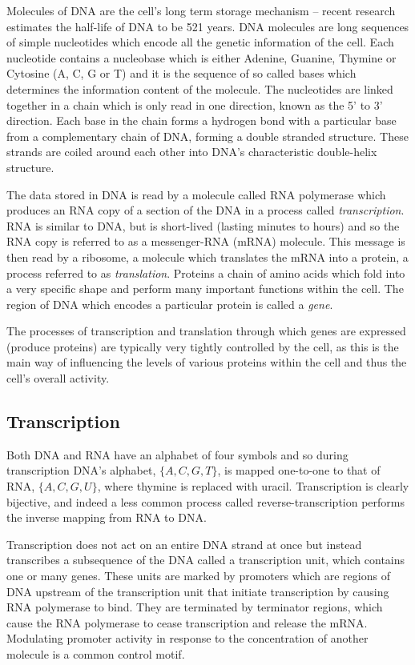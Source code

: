 Molecules of DNA are the cell's long term storage mechanism -- recent research
estimates the half-life of DNA to be 521 years\cite{DNAhalflife}.
DNA molecules are long sequences of simple nucleotides which encode all the
genetic information of the cell.
Each nucleotide contains a nucleobase which is either Adenine, Guanine,
Thymine or Cytosine (A, C, G or T) and it is the sequence of so called bases 
which determines the information content of the molecule.
The nucleotides are linked together in a chain which is only read in one 
direction, known as the 5' to 3' direction.
Each base in the chain forms a hydrogen bond with a particular base from a 
complementary chain of DNA, forming a double stranded structure.
These strands are coiled around each other into DNA's characteristic 
double-helix structure.

The data stored in DNA is read by a molecule called RNA polymerase which 
produces an RNA copy of a section of the DNA in a process called
\textit{transcription}.
RNA is similar to DNA, but is short-lived (lasting minutes to hours) and so the
RNA copy is referred to as a messenger-RNA (mRNA) molecule.
This message is then read by a ribosome, a molecule which translates the mRNA 
into a protein, a process referred to as \textit{translation}.
Proteins a chain of amino acids which fold into a very specific shape and 
perform many important functions within the cell.
The region of DNA which encodes a particular protein is called a \textit{gene}.

The processes of transcription and translation through which genes are 
expressed (produce proteins) are typically very tightly
controlled by the cell, as this is the main way of influencing the levels of
various proteins within the cell and thus the cell's overall activity.

\subsection{Transcription}
\label{sec:transcription}

Both DNA and RNA have an alphabet of four symbols and so during transcription
DNA's alphabet, $\{A,C,G,T\}$, is mapped one-to-one to that
of RNA, $\{A,C,G,U\}$, where thymine is replaced with uracil.
Transcription is clearly bijective, and indeed a less common process called
reverse-transcription performs the inverse mapping from RNA to DNA.

Transcription does not act on an entire DNA strand at once but instead
transcribes a subsequence of the DNA called a transcription unit, which
contains one or many genes.
These units are marked by promoters which are regions of DNA upstream
of the transcription unit that initiate transcription by causing RNA polymerase
to bind.
They are terminated by terminator regions, which cause the RNA polymerase to
cease transcription and release the mRNA.
Modulating promoter activity in response to the concentration of another 
molecule is a common control motif.

